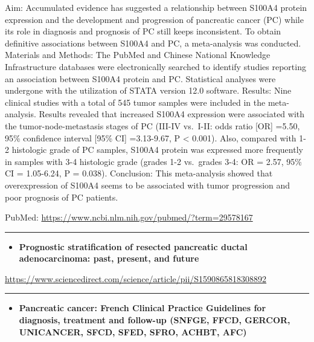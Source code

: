 \documentclass[]{article}
\providecommand{\tightlist}{%
  \setlength{\itemsep}{0pt}\setlength{\parskip}{0pt}}
\begin{document}
Aim: Accumulated evidence has suggested a relationship between S100A4
protein expression and the development and progression of pancreatic
cancer (PC) while its role in diagnosis and prognosis of PC still keeps
inconsistent. To obtain definitive associations between S100A4 and PC, a
meta-analysis was conducted. Materials and Methods: The PubMed and
Chinese National Knowledge Infrastructure databases were electronically
searched to identify studies reporting an association between S100A4
protein and PC. Statistical analyses were undergone with the utilization
of STATA version 12.0 software. Results: Nine clinical studies with a
total of 545 tumor samples were included in the meta-analysis. Results
revealed that increased S100A4 expression were associated with the
tumor-node-metastasis stages of PC (III-IV vs.~I-II: odds ratio {[}OR{]}
=5.50, 95\% confidence interval {[}95\% CI{]} =3.13-9.67, P \textless{}
0.001). Also, compared with 1-2 histologic grade of PC samples, S100A4
protein was expressed more frequently in samples with 3-4 histologic
grade (grades 1-2 vs.~grades 3-4: OR = 2.57, 95\% CI = 1.05-6.24, P =
0.038). Conclusion: This meta-analysis showed that overexpression of
S100A4 seems to be associated with tumor progression and poor prognosis
of PC patients.

PubMed: \url{https://www.ncbi.nlm.nih.gov/pubmed/?term=29578167}

{}

{}

\begin{center}\rule{0.5\linewidth}{\linethickness}\end{center}

\begin{itemize}
\tightlist
\item
  \textbf{Prognostic stratification of resected pancreatic ductal
  adenocarcinoma: past, present, and future}
\end{itemize}

\url{https://www.sciencedirect.com/science/article/pii/S1590865818308892}

\begin{center}\rule{0.5\linewidth}{\linethickness}\end{center}

\begin{itemize}
\tightlist
\item
  \textbf{Pancreatic cancer: French Clinical Practice Guidelines for
  diagnosis, treatment and follow-up (SNFGE, FFCD, GERCOR, UNICANCER,
  SFCD, SFED, SFRO, ACHBT, AFC)}
\end{itemize}
\end{document}
